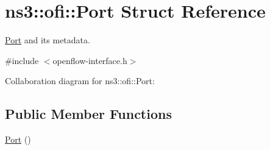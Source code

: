 \hypertarget{structns3_1_1ofi_1_1Port}{}\section{ns3\+:\+:ofi\+:\+:Port Struct Reference}
\label{structns3_1_1ofi_1_1Port}


\hyperlink{structns3_1_1ofi_1_1Port}{Port} and its metadata.  




{\ttfamily \#include $<$openflow-\/interface.\+h$>$}



Collaboration diagram for ns3\+:\+:ofi\+:\+:Port\+:
\subsection*{Public Member Functions}
\begin{DoxyCompactItemize}
\item 
\hyperlink{structns3_1_1ofi_1_1Port_a97b805b4d4231897525566182da98444}{Port} ()
\end{DoxyCompactItemize}
